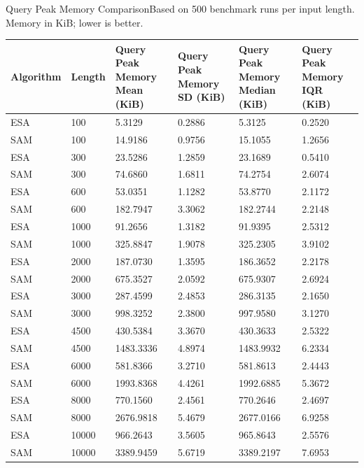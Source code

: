 \begin{benchmarktable}{Query Peak Memory Comparison}{Based on 500 benchmark runs per input length. Memory in KiB; lower is better.}
\begin{tabularx}{\textwidth}{|X|X|X|X|X|X|}
\toprule
Algorithm & Length & Query Peak Memory Mean (KiB) & Query Peak Memory SD (KiB) & Query Peak Memory Median (KiB) & Query Peak Memory IQR (KiB) \\
\midrule
ESA & 100 & 5.3129 & 0.2886 & 5.3125 & 0.2520 \\
SAM & 100 & 14.9186 & 0.9756 & 15.1055 & 1.2656 \\
\hline
ESA & 300 & 23.5286 & 1.2859 & 23.1689 & 0.5410 \\
SAM & 300 & 74.6860 & 1.6811 & 74.2754 & 2.6074 \\
\hline
ESA & 600 & 53.0351 & 1.1282 & 53.8770 & 2.1172 \\
SAM & 600 & 182.7947 & 3.3062 & 182.2744 & 2.2148 \\
\hline
ESA & 1000 & 91.2656 & 1.3182 & 91.9395 & 2.5312 \\
SAM & 1000 & 325.8847 & 1.9078 & 325.2305 & 3.9102 \\
\hline
ESA & 2000 & 187.0730 & 1.3595 & 186.3652 & 2.2178 \\
SAM & 2000 & 675.3527 & 2.0592 & 675.9307 & 2.6924 \\
\hline
ESA & 3000 & 287.4599 & 2.4853 & 286.3135 & 2.1650 \\
SAM & 3000 & 998.3252 & 2.3800 & 997.9580 & 3.1270 \\
\hline
ESA & 4500 & 430.5384 & 3.3670 & 430.3633 & 2.5322 \\
SAM & 4500 & 1483.3336 & 4.8974 & 1483.9932 & 6.2334 \\
\hline
ESA & 6000 & 581.8366 & 3.2710 & 581.8613 & 2.4443 \\
SAM & 6000 & 1993.8368 & 4.4261 & 1992.6885 & 5.3672 \\
\hline
ESA & 8000 & 770.1560 & 2.4561 & 770.2646 & 2.4697 \\
SAM & 8000 & 2676.9818 & 5.4679 & 2677.0166 & 6.9258 \\
\hline
ESA & 10000 & 966.2643 & 3.5605 & 965.8643 & 2.5576 \\
SAM & 10000 & 3389.9459 & 5.6719 & 3389.2197 & 7.6953 \\
\bottomrule
\end{tabularx}
\end{benchmarktable}

